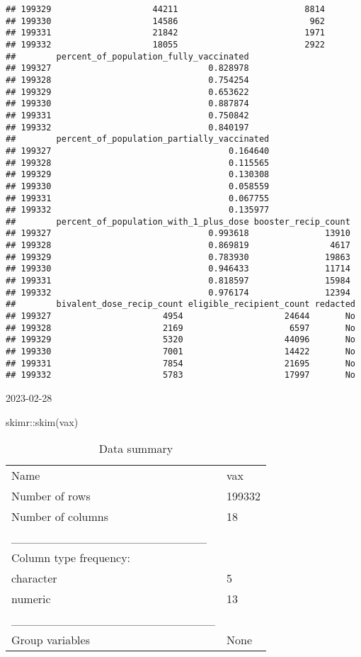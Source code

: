 \documentclass[
]{article}
\newenvironment{Shaded}{\begin{snugshade}}{\end{snugshade}}
\newcommand{\FunctionTok}[1]{\textcolor[rgb]{0.00,0.00,0.00}{#1}}
\newcommand{\NormalTok}[1]{#1}
\newcommand{\SpecialCharTok}[1]{\textcolor[rgb]{0.00,0.00,0.00}{#1}}
\begin{document}
\begin{verbatim}
## 199329                    44211                         8814
## 199330                    14586                          962
## 199331                    21842                         1971
## 199332                    18055                         2922
##        percent_of_population_fully_vaccinated
## 199327                               0.828978
## 199328                               0.754254
## 199329                               0.653622
## 199330                               0.887874
## 199331                               0.750842
## 199332                               0.840197
##        percent_of_population_partially_vaccinated
## 199327                                   0.164640
## 199328                                   0.115565
## 199329                                   0.130308
## 199330                                   0.058559
## 199331                                   0.067755
## 199332                                   0.135977
##        percent_of_population_with_1_plus_dose booster_recip_count
## 199327                               0.993618               13910
## 199328                               0.869819                4617
## 199329                               0.783930               19863
## 199330                               0.946433               11714
## 199331                               0.818597               15984
## 199332                               0.976174               12394
##        bivalent_dose_recip_count eligible_recipient_count redacted
## 199327                      4954                    24644       No
## 199328                      2169                     6597       No
## 199329                      5320                    44096       No
## 199330                      7001                    14422       No
## 199331                      7854                    21695       No
## 199332                      5783                    17997       No
\end{verbatim}

2023-02-28

\begin{Shaded}
\begin{Highlighting}[]
\NormalTok{skimr}\SpecialCharTok{::}\FunctionTok{skim}\NormalTok{(vax)}
\end{Highlighting}
\end{Shaded}

\begin{longtable}[]{@{}ll@{}}
\caption{Data summary}\tabularnewline
\toprule
\endhead
Name & vax \\
Number of rows & 199332 \\
Number of columns & 18 \\
\_\_\_\_\_\_\_\_\_\_\_\_\_\_\_\_\_\_\_\_\_\_\_ & \\
Column type frequency: & \\
character & 5 \\
numeric & 13 \\
\_\_\_\_\_\_\_\_\_\_\_\_\_\_\_\_\_\_\_\_\_\_\_\_ & \\
Group variables & None \\
\bottomrule
\end{longtable}
\end{document}
